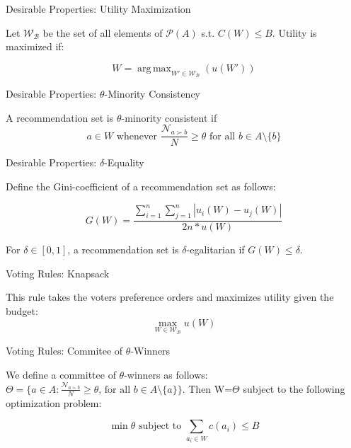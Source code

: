 \documentclass{beamer}
\DeclareMathOperator*{\argmax}{arg\,max}
\begin{document}
\begin{frame}{Desirable Properties: Utility Maximization}

Let $\mathcal {W_B}$ be the set of all elements of $\mathcal{P}(A)$ s.t. $C(W)\leq B$. Utility is maximized if:

\[
W=\argmax_{W'\in \mathcal{W_B}}(u(W')) 
\]

	
\end{frame}

\begin{frame}{Desirable Properties: $\theta$-Minority Consistency}
	
A recommendation set is $\theta$-minority consistent if \[a\in W\text{ whenever }\frac {\mathcal{N}_{a\succ b}}{N}\geq \theta \text{ for all } b\in A\setminus \{b\} \]
	
\end{frame}

\begin{frame}{Desirable Properties: $\delta$-Equality}
	
	Define the Gini-coefficient of a recommendation set as follows: 
	
	\[G(W)=\frac{\displaystyle{\sum_{i=1}^n \sum_{j=1}^n \left| u_i(W) - u_j(W) \right|}}{\displaystyle{2n* u(W)}}\]
	
	For $\delta\in [0,1]$, a recommendation set is $\delta$-egalitarian if $G(W)\leq \delta$. 
	
\end{frame}

\begin{frame}{Voting Rules: Knapsack}

This rule takes the voters preference orders and maximizes utility given the budget:
\[
\max_{W\in\mathcal{ W_B}} u(W)
	\]
	
\end{frame}

\begin{frame}{Voting Rules: Commitee of $\theta$-Winners}
	
We define a committee of $\theta$-winners as follows:  $\Theta=\{a\in A: \frac {\mathcal{N}_{a\succ b}}{N}\geq \theta\text {, for all } b\in A\setminus\{a\}\}$. Then W=$\Theta$ subject to the following optimization problem:
	
	\[\min \theta \text{ subject to } \sum_{a_i\in W}c(a_i)\leq B\]
\end{frame}

%
%
\end{document}
